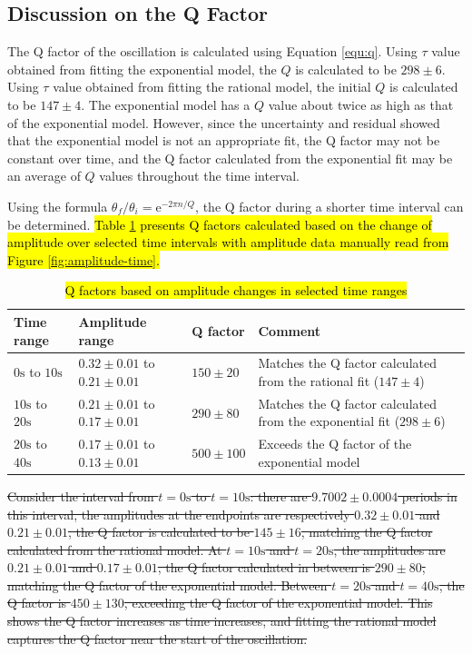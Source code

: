 \documentclass[12pt]{article}
\newcommand{\e}{\mathrm{e}}
\DeclareRobustCommand{\hlnew}[1]{{\sethlcolor{hlcnew}\hl{#1}}}
\DeclareRobustCommand{\hldel}[1]{{\st{#1}}}
\begin{document}
\subsection{Discussion on the Q Factor} \label{section:q}

The Q factor of the oscillation is calculated using Equation \ref{equ:q}. Using $\tau$ value obtained from fitting the exponential model, the $Q$ is calculated to be $298\pm6$. Using $\tau$ value obtained from fitting the rational model, the initial $Q$ is calculated to be $147\pm4$. The exponential model has a $Q$ value about twice as high as that of the exponential model. However, since the uncertainty and residual showed that the exponential model is not an appropriate fit, the Q factor may not be constant over time, and the Q factor calculated from the exponential fit may be an average of $Q$ values throughout the time interval.

Using the formula $\theta_f/\theta_i=\e^{-2\pi n/Q}$, the Q factor during a shorter time interval can be determined. \hlnew{Table {\ref{table:q-change}} presents Q factors calculated based on the change of amplitude over selected time intervals with amplitude data manually read from Figure {\ref{fig:amplitude-time}}.}

\begin{table}[h]
\begin{tabularx}{\textwidth}{ |l|l|l|X| }
\hline
Time range &
Amplitude range &
Q factor &
Comment
\\ \hline
$0\mathrm{s}$ to $10\mathrm{s}$ &
$0.32\pm0.01$ to $0.21\pm0.01$ &
$150\pm20$ &
Matches the Q factor calculated from the rational fit ($147\pm4$)
\\ \hline
$10\mathrm{s}$ to $20\mathrm{s}$ &
$0.21\pm0.01$ to $0.17\pm0.01$ &
$290\pm80$ &
Matches the Q factor calculated from the exponential fit ($298\pm6$)
\\ \hline
$20\mathrm{s}$ to $40\mathrm{s}$ &
$0.17\pm0.01$ to $0.13\pm0.01$ &
$500\pm100$ &
Exceeds the Q factor of the exponential model
\\ \hline
\end{tabularx}
\caption{\hlnew{Q factors based on amplitude changes in selected time ranges}}
\label{table:q-change}
\end{table}

\hldel{Consider the interval from $t=0\mathrm{s}$ to $t=10\mathrm{s}$: there are $9.7002\pm0.0004$ periods in this interval, the amplitudes at the endpoints are respectively $0.32\pm0.01$ and $0.21\pm0.01$, the Q factor is calculated to be $145\pm16$, matching the Q factor calculated from the rational model. At $t=10\mathrm{s}$ and $t=20\mathrm{s}$, the amplitudes are $0.21\pm0.01$ and $0.17\pm0.01$, the Q factor calculated in between is $290\pm80$, matching the Q factor of the exponential model. Between $t=20\mathrm{s}$ and $t=40\mathrm{s}$, the Q factor is $450\pm130$, exceeding the Q factor of the exponential model. This shows the Q factor increases as time increases, and fitting the rational model captures the Q factor near the start of the oscillation.}
\end{document}
